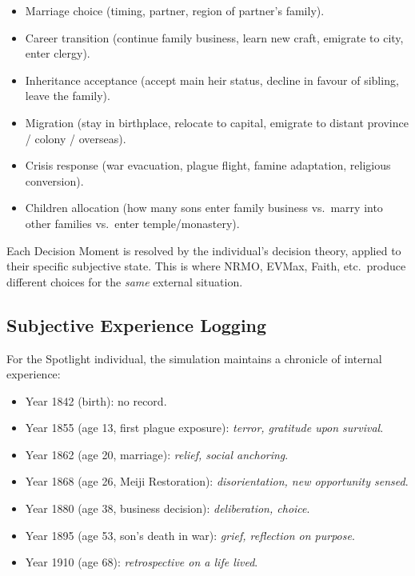 \begin{itemize}[itemsep=1pt]
\item Marriage choice (timing, partner, region of partner's family).
\item Career transition (continue family business, learn new craft,
emigrate to city, enter clergy).
\item Inheritance acceptance (accept main heir status, decline in
favour of sibling, leave the family).
\item Migration (stay in birthplace, relocate to capital, emigrate to
distant province / colony / overseas).
\item Crisis response (war evacuation, plague flight, famine
adaptation, religious conversion).
\item Children allocation (how many sons enter family business
vs.\ marry into other families vs.\ enter temple/monastery).
\end{itemize}

Each Decision Moment is resolved by the individual's decision theory,
applied to their specific subjective state. This is where NRMO,
EVMax, Faith, etc.\ produce different choices for the \emph{same}
external situation.

\subsection{Subjective Experience Logging}
\label{sec:vision-subjective}

For the Spotlight individual, the simulation maintains a chronicle of
internal experience:

\begin{itemize}
\item Year 1842 (birth): no record.
\item Year 1855 (age 13, first plague exposure): \emph{terror, gratitude
upon survival}.
\item Year 1862 (age 20, marriage): \emph{relief, social anchoring}.
\item Year 1868 (age 26, Meiji Restoration): \emph{disorientation, new
opportunity sensed}.
\item Year 1880 (age 38, business decision): \emph{deliberation,
choice}.
\item Year 1895 (age 53, son's death in war): \emph{grief, reflection on
purpose}.
\item Year 1910 (age 68): \emph{retrospective on a life lived}.
\end{itemize}

